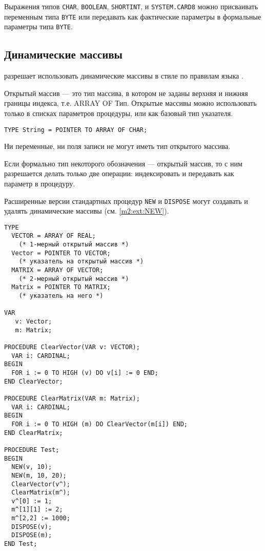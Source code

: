 \mextonly

Выражения типов {\tt CHAR}, {\tt BOOLEAN}, {\tt SHORTINT},
и {\tt SYSTEM.CARD8} можно присваивать переменным типа
{\tt BYTE}  или передавать как фактические параметры в формальные
параметры типа {\tt BYTE}.

\subsection{Динамические массивы}\label{m2:ext:dynarrs}

\mextonly

\xds{} разрешает использовать динамические массивы в стиле
\ot{}  по правилам языка \ot{}.

Открытый массив --- это тип массива, в котором не заданы 
верхняя и нижняя границы индекса, т.е.
ARRAY OF Тип. 
Открытые массивы можно использовать только в списках параметров
процедуры, или как базовый тип указателя.
\begin{verbatim}
TYPE String = POINTER TO ARRAY OF CHAR;
\end{verbatim}
Ни переменные, ни поля записи не могут иметь тип открытого массива.

Если формально тип некоторого обозначения --- открытый массив,
то с ним разрешается делать только две операции: индексировать
и передавать как параметр в процедуру.

Расширенные версии стандартных процедур {\tt NEW} и
{\tt DISPOSE} могут создавать и удалять динамические массивы
(см. \ref{m2:ext:NEW}).



\Example
\begin{verbatim}
TYPE
  VECTOR = ARRAY OF REAL;
    (* 1-мерный открытый массив *)
  Vector = POINTER TO VECTOR;
    (* указатель на открытый массив *)
  MATRIX = ARRAY OF VECTOR;
    (* 2-мерный открытый массив *)
  Matrix = POINTER TO MATRIX;
    (* указатель на него *)

VAR
   v: Vector;
   m: Matrix;

PROCEDURE ClearVector(VAR v: VECTOR);
  VAR i: CARDINAL;
BEGIN
  FOR i := 0 TO HIGH (v) DO v[i] := 0 END;
END ClearVector;

PROCEDURE ClearMatrix(VAR m: Matrix);
  VAR i: CARDINAL;
BEGIN
  FOR i := 0 TO HIGH (m) DO ClearVector(m[i]) END;
END ClearMatrix;

PROCEDURE Test;
BEGIN
  NEW(v, 10);
  NEW(m, 10, 20);
  ClearVector(v^);
  ClearMatrix(m^);
  v^[0] := 1;
  m^[1][1] := 2;
  m^[2,2] := 1000;
  DISPOSE(v);
  DISPOSE(m);
END Test;
\end{verbatim}

